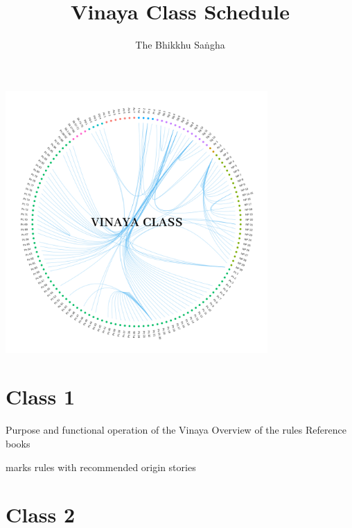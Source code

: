 \documentclass[11pt,oneside]{memoir}
\title{Vinaya Class Schedule}
\author{The Bhikkhu Saṅgha}
\begin{document}
\thispagestyle{empty}

\vspace*{-10mm}
{\centering
  \includegraphics[width=100mm]{../../assets/vinaya-class-title/vinaya-class-title-300dpi.png}
\par}

\bigskip

\chapter{Class 1}

\centeringsectiontrue

{\centering
{}

 Purpose and functional operation of the Vinaya\quad
{} Overview of the rules\quad
{} Reference books

\orig{} marks rules with recommended origin stories
\par}

\centeringsectionfalse
\numberedtopicstrue

\chapter{Class 2}
\end{document}
